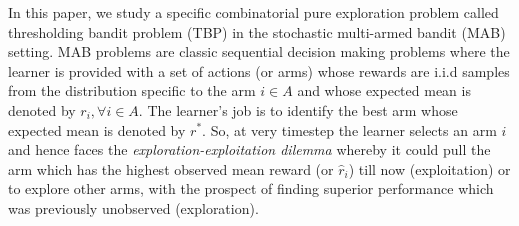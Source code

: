 In this paper, we study a specific combinatorial pure exploration problem called thresholding bandit problem (TBP) in the stochastic multi-armed bandit (MAB) setting. MAB problems are classic sequential decision making problems where the learner is provided with a set of actions (or arms) whose rewards are i.i.d samples from the distribution specific to the arm $i\in A$ and whose expected mean is denoted by $r_{i},\forall i\in A$. The learner's job is to identify the best arm whose expected mean is denoted by $r^{*}$. So, at very timestep the learner selects an arm $i$ and hence faces the \emph{exploration-exploitation dilemma} whereby it could pull the arm which has the highest observed mean reward (or $\hat{r}_{i}$) till now (exploitation) or to explore other arms, with the prospect of finding superior performance which was previously unobserved (exploration).


%
%

